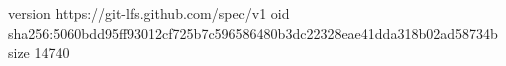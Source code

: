 version https://git-lfs.github.com/spec/v1
oid sha256:5060bdd95ff93012cf725b7c596586480b3dc22328eae41dda318b02ad58734b
size 14740
